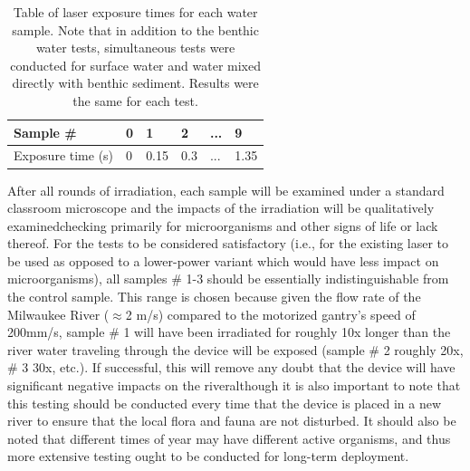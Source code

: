 \documentclass[fleqn,10pt]{SelfArx} %
\begin{document}
	\begin{table}[h]
		\begin{tabular}{|l|l|l|l|l|l|}
			\hline
			Sample \#         & 0 & 1    & 2   & ... & 9    \\ \hline
			Exposure time (s) & 0 & 0.15 & 0.3 & ... & 1.35 \\ \hline
		\end{tabular}
		\caption[Laser Exposure Time Table]{Table of laser exposure times for each water sample. Note that in addition to the \gls{benthic} water tests, simultaneous tests were conducted for surface water and water mixed directly with \gls{benthic} sediment. Results were the same for each test.}
	\end{table}
	
	After all rounds of irradiation, each sample will be examined under a standard classroom microscope and the impacts of the irradiation will be qualitatively examined\textemdash checking primarily for microorganisms and other signs of life or lack thereof. For the tests to be considered satisfactory (i.e., for the existing laser to be used as opposed to a lower-power variant which would have less impact on microorganisms), all samples \# 1-3 should be essentially indistinguishable from the control sample. This range is chosen because given the flow rate of the Milwaukee River ($\approx$2 m/s) compared to the motorized gantry’s speed of 200mm/s, sample \# 1 will have been irradiated for roughly 10x longer than the river water traveling through the device will be exposed (sample \# 2 roughly 20x, \# 3 30x, etc.). If successful, this will remove any doubt that the device will have significant negative impacts on the river\textemdash although it is also important to note that this testing should be conducted every time that the device is placed in a new river to ensure that the local flora and fauna are not disturbed. It should also be noted that different times of year may have different active organisms, and thus more extensive testing ought to be conducted for long-term deployment.
	
\end{document}
